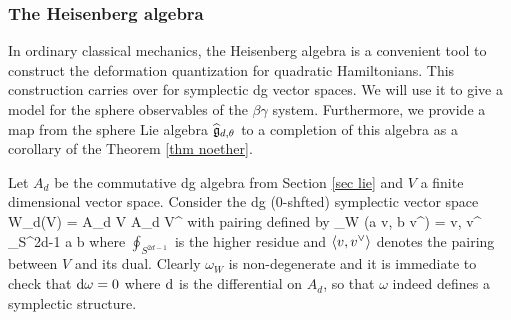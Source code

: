 \subsubsection{The Heisenberg algebra}

In ordinary classical mechanics, the Heisenberg algebra is a convenient tool to construct the deformation quantization for quadratic Hamiltonians.
This construction carries over for symplectic dg vector spaces.
We will use it to give a model for the sphere observables of the $\beta\gamma$ system.
Furthermore, we provide a map from the sphere Lie algebra $\widehat{\mathfrak g}_{d, \theta}$ to a completion of this algebra as a corollary of the Theorem \ref{thm noether}.

Let $A_d$ be the commutative dg algebra from Section \ref{sec lie} and $V$ a finite dimensional vector space. 
Consider the dg (0-shfted) symplectic vector space
\ben
W_d(V) = A_d \tensor V \oplus A_d \tensor V^\vee [d-1]
\een
with pairing defined by
\ben
\omega_W (a \tensor v, b \tensor v^\vee) = \<v, v^\vee\> \oint_{S^{2d-1}} a \wedge b 
\een
where $\oint_{S^{2d-1}}$ is the higher residue and $\langle v,v^\vee\rangle$ denotes the pairing between $V$ and its dual. 
Clearly $\omega_W$ is non-degenerate and it is immediate to check that ${\rm d} \omega = 0$ where ${\rm d}$ is the differential on $A_d$, so that $\omega$ indeed defines a symplectic structure. 



